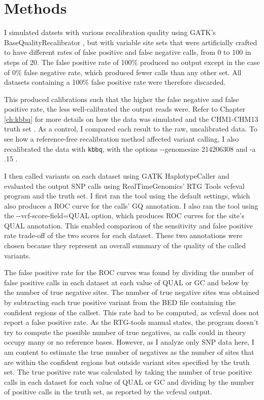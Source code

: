 \section{Methods}

I simulated datsets with various recalibration quality using GATK's BaseQualityRecalibrator \parencite{auwera_fastq_2013}, but with variable site sets that were artificially crafted to have different rates of false positive and false negative calls, from 0 to 100 in steps of 20. The false positive rate of 100\% produced no output except in the case of 0\% false negative rate, which produced fewer calls than any other set. All datasets containing a 100\% false positive rate were therefore discarded.

This produced calibrations such that the higher the false negative and false positive rate, the less well-calibrated the output reads were. Refer to Chapter \ref{ch:kbbq} for more details on how the data was simulated and the CHM1-CHM13 truth set \parencite{li_synthetic-diploid_2018}. As a control, I compared each result to the raw, uncalibrated data. To see how a reference-free recalibration method affected variant calling, I also recalibrated the data with \texttt{kbbq}, with the options -\phantom{}-genomesize 214206308 and -a .15 .

I then called variants on each dataset using GATK HaplotypeCaller \parencite{poplin_scaling_2018} and evaluated the output SNP calls using RealTimeGenomics' RTG Tools vcfeval program \parencite{cleary_comparing_2015} and the truth set. I first ran the tool using the default settings, which also produces a ROC curve for the calls' GQ annotation. I also ran the tool using the -\phantom{}-vcf-score-field=QUAL option, which produces ROC curves for the site's QUAL annotation. This enabled comparison of the sensitivity and false positive rate trade-off of the two scores for each dataset. These two annotations were chosen because they represent an overall summary of the quality of the called variants.

The false positive rate for the ROC curves was found by dividing the number of false positive calls in each dataset at each value of QUAL or GC and below by the number of true negative sites. The number of true negative sites was obtained by subtracting each true positive variant from the BED file containing the confident regions of the callset. This rate had to be computed, as vcfeval does not report a false positive rate. As the RTG-tools manual states, the program doesn't try to compute the possible number of true negatives, as calls could in theory occupy many or no reference bases. However, as I analyze only SNP data here, I am content to estimate the true number of negatives as the number of sites that are within the confident regions but outside variant sites specified by the truth set. The true positive rate was calculated by taking the number of true positive calls in each dataset for each value of QUAL or GC and dividing by the number of positive calls in the truth set, as reported by the vcfeval output.

